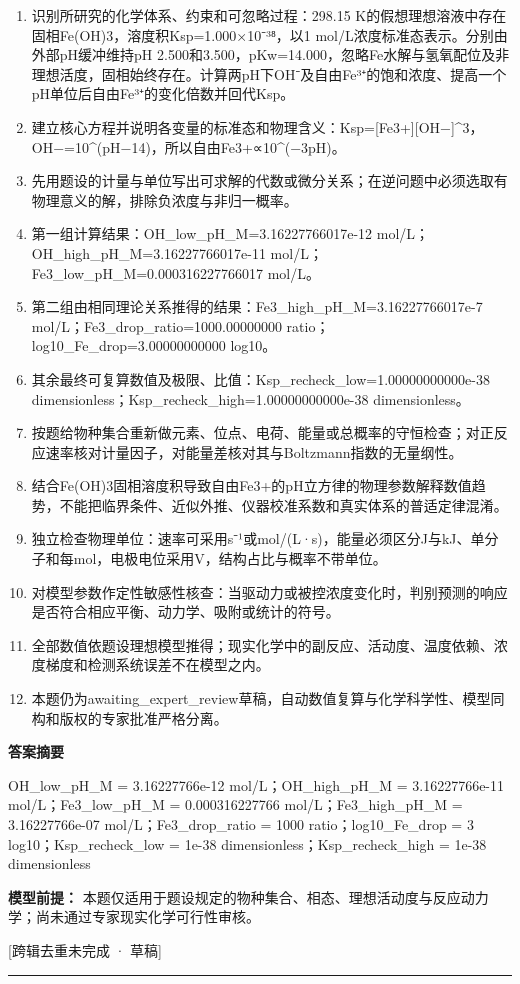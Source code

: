 \documentclass[UTF8,11pt,a4paper]{ctexart}
\begin{document}
\begin{enumerate}
\item 识别所研究的化学体系、约束和可忽略过程：298.15 K的假想理想溶液中存在固相Fe(OH)3，溶度积Ksp=1.000×10⁻³⁸，以1 mol/L浓度标准态表示。分别由外部pH缓冲维持pH 2.500和3.500，pKw=14.000，忽略Fe水解与氢氧配位及非理想活度，固相始终存在。计算两pH下OH⁻及自由Fe³⁺的饱和浓度、提高一个pH单位后自由Fe³⁺的变化倍数并回代Ksp。
\item 建立核心方程并说明各变量的标准态和物理含义：Ksp=[Fe3+][OH−]\textasciicircum{}3，OH−=10\textasciicircum{}(pH−14)，所以自由Fe3+∝10\textasciicircum{}(−3pH)。
\item 先用题设的计量与单位写出可求解的代数或微分关系；在逆问题中必须选取有物理意义的解，排除负浓度与非归一概率。
\item 第一组计算结果：OH\_low\_pH\_M=3.16227766017e-12 mol/L；OH\_high\_pH\_M=3.16227766017e-11 mol/L；Fe3\_low\_pH\_M=0.000316227766017 mol/L。
\item 第二组由相同理论关系推得的结果：Fe3\_high\_pH\_M=3.16227766017e-7 mol/L；Fe3\_drop\_ratio=1000.00000000 ratio；log10\_Fe\_drop=3.00000000000 log10。
\item 其余最终可复算数值及极限、比值：Ksp\_recheck\_low=1.00000000000e-38 dimensionless；Ksp\_recheck\_high=1.00000000000e-38 dimensionless。
\item 按题给物种集合重新做元素、位点、电荷、能量或总概率的守恒检查；对正反应速率核对计量因子，对能量差核对其与Boltzmann指数的无量纲性。
\item 结合Fe(OH)3固相溶度积导致自由Fe3+的pH立方律的物理参数解释数值趋势，不能把临界条件、近似外推、仪器校准系数和真实体系的普适定律混淆。
\item 独立检查物理单位：速率可采用s⁻¹或mol/(L·s)，能量必须区分J与kJ、单分子和每mol，电极电位采用V，结构占比与概率不带单位。
\item 对模型参数作定性敏感性核查：当驱动力或被控浓度变化时，判别预测的响应是否符合相应平衡、动力学、吸附或统计的符号。
\item 全部数值依题设理想模型推得；现实化学中的副反应、活动度、温度依赖、浓度梯度和检测系统误差不在模型之内。
\item 本题仍为awaiting\_expert\_review草稿，自动数值复算与化学科学性、模型同构和版权的专家批准严格分离。
\end{enumerate}
\noindent\textbf{答案摘要}\par
OH\_low\_pH\_M = 3.16227766e-12 mol/L；OH\_high\_pH\_M = 3.16227766e-11 mol/L；Fe3\_low\_pH\_M = 0.000316227766 mol/L；Fe3\_high\_pH\_M = 3.16227766e-07 mol/L；Fe3\_drop\_ratio = 1000 ratio；log10\_Fe\_drop = 3 log10；Ksp\_recheck\_low = 1e-38 dimensionless；Ksp\_recheck\_high = 1e-38 dimensionless\par
\noindent\textbf{模型前提：}
本题仅适用于题设规定的物种集合、相态、理想活动度与反应动力学；尚未通过专家现实化学可行性审核。\par
\noindent\textcolor{red!65!black}{[跨辑去重未完成 · 草稿]} \par
\medskip\hrule\medskip
{}
\end{document}

